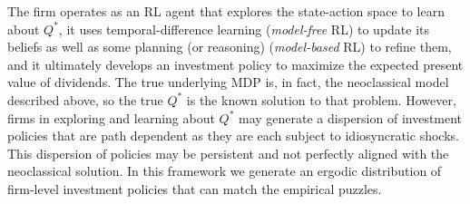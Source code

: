 The firm operates as an RL agent that explores the state-action space to learn 
about $Q^*$, it uses temporal-difference learning (\textit{model-free} RL) to update 
its beliefs as well as some planning (or reasoning) (\textit{model-based} RL) to refine 
them, and it ultimately develops an investment policy to maximize the expected present value of dividends.
The true underlying MDP is, in fact, the neoclassical model described above, so the true 
$Q^*$ is the known solution to that problem. However, firms in exploring and learning
about $Q^*$ may generate a dispersion of investment policies that are path dependent as
they are each subject to idiosyncratic shocks. This dispersion of policies may be persistent and
not perfectly aligned with the neoclassical solution. In this framework we generate an 
ergodic distribution of firm-level investment policies that can match the empirical puzzles.






